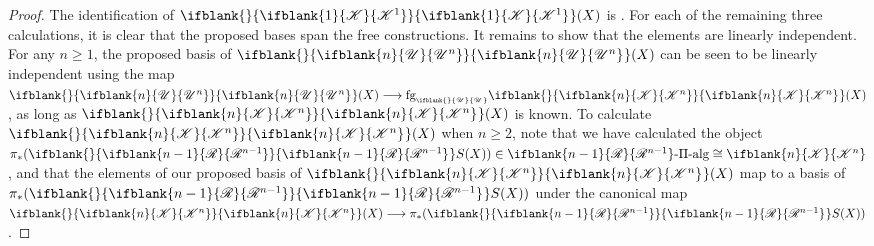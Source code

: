 \documentclass[10pt]{article}
\newcommand{\GS}[1]{\scrE^{#1}}
\newcommand{\RestLie}[1]%
{\ifblank{#1}{\mathsf{r}{\scrL}}{\mathsf{r}{\scrL}^{#1}}}
\newcommand{\GoodLie}[1]%
{\ifblank{#1}{\mathsf{g}{\scrL}}{\mathsf{g}{\scrL}^{#1}}}
\newcommand{\PRLie}[1]%
{\ifblank{#1}{\scrR}{\scrR^{#1}}}
\newcommand{\LL}[1]{\ifblank{#1}{\scrK}{\scrK^{#1}}}
\newcommand{\GR}[1]{\ifblank{#1}{\scrV}{\scrV^{#1}}}
\newcommand{\nontop}[1]{\ifblank{#1}{\scrU}{\scrU^{#1}}}
\newcommand{\PiAlg}[1]{#1\textup{-$\Pi$-alg}}
\newcommand{\admis}[1]{\mathrm{adm}(#1)}%
\newcommand{\forget}[1]{\mathrm{fg}_{\smash{\mbox{\tiny $#1$}}}}
\newcommand{\Fr}[2][]{\ifblank{#1}{#2}{#2_{#1}}}
\renewcommand{\Q}{Q}
\begin{document}
\begin{CategoriesOfInterest}
%
\begin{proof}
The identification of $\Fr{\LL{1}}(X)$ is \cite[Thm F, p.15]{MR1089001}.
For each of the remaining three calculations, it is clear that the proposed bases span the free constructions. It remains to show that the elements are linearly independent.
For any $n\geq1$, the proposed basis of $\Fr{\nontop{n}}(X)$ can be seen to be linearly independent using the map $\Fr{\nontop{n}}(X)\to \forget{\nontop{}}\Fr{\LL{n}}(X)$, as long as $\Fr{\LL{n}}(X)$ is known. To calculate $\Fr{\LL{n}}(X)$ when $n\geq2$, note that we have calculated the object $\pi_*(\Fr{\PRLie{n-1}}S(X))\in \PiAlg{\PRLie{n-1}}\cong\LL{n}$, and that the elements of our proposed basis of $\Fr{\LL{n}}(X)$ map to a basis of $\pi_*(\Fr{\PRLie{n-1}}S(X))$ under the canonical map $\Fr{\LL{n}}(X)\to \pi_*(\Fr{\PRLie{n-1}}S(X))$. %

\end{proof}
\end{CategoriesOfInterest}
\end{document}
